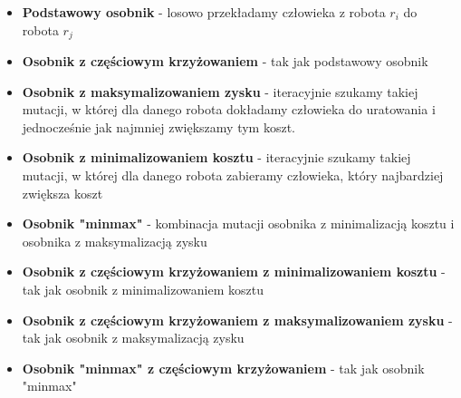 \documentclass[12pt]{article}
\begin{document}
\begin{itemize}
    \item \textbf{Podstawowy osobnik} - losowo przekładamy człowieka z robota $r_i$ do robota $r_j$

    \item \textbf{Osobnik z częściowym krzyżowaniem} - tak jak podstawowy osobnik

    \item \textbf{Osobnik z maksymalizowaniem zysku} - iteracyjnie szukamy takiej mutacji, w której dla danego robota dokładamy człowieka do uratowania i jednocześnie jak najmniej zwiększamy tym koszt.

    \item \textbf{Osobnik z minimalizowaniem kosztu} - iteracyjnie szukamy takiej mutacji, w której dla danego robota zabieramy człowieka, który najbardziej zwiększa koszt

    \item \textbf{Osobnik "minmax"} - kombinacja mutacji osobnika z minimalizacją kosztu i osobnika z maksymalizacją zysku

     \item \textbf{Osobnik z częściowym krzyżowaniem z minimalizowaniem kosztu} - tak jak osobnik z minimalizowaniem kosztu
    
    \item \textbf{Osobnik z częściowym krzyżowaniem z maksymalizowaniem zysku} - tak jak osobnik z maksymalizacją zysku
    
    \item \textbf{Osobnik "minmax" z częściowym krzyżowaniem} - tak jak osobnik "minmax"

    
\end{itemize}





\end{document}
